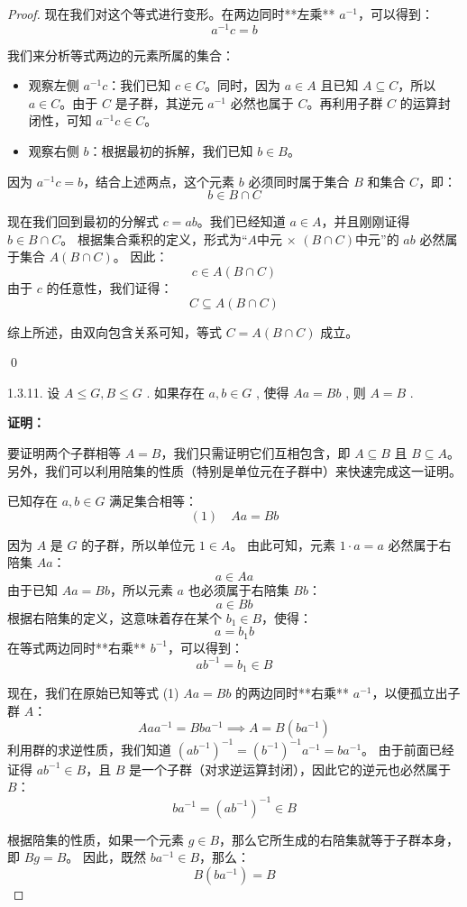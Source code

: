 \documentclass[]{article}
\begin{document}
\begin{proof}
现在我们对这个等式进行变形。在两边同时**左乘** $a^{-1}$，可以得到：
\[ a^{-1}c = b \]

我们来分析等式两边的元素所属的集合：
\begin{itemize}
	\item 观察左侧 $a^{-1}c$：我们已知 $c \in C$。同时，因为 $a \in A$ 且已知 $A \subseteq C$，所以 $a \in C$。由于 $C$ 是子群，其逆元 $a^{-1}$ 必然也属于 $C$。再利用子群 $C$ 的运算封闭性，可知 $a^{-1}c \in C$。
	\item 观察右侧 $b$：根据最初的拆解，我们已知 $b \in B$。
\end{itemize}

因为 $a^{-1}c = b$，结合上述两点，这个元素 $b$ 必须同时属于集合 $B$ 和集合 $C$，即：
\[ b \in B \cap C \]

现在我们回到最初的分解式 $c = ab$。我们已经知道 $a \in A$，并且刚刚证得 $b \in B \cap C$。
根据集合乘积的定义，形式为“$A$中元 $\times$ $(B \cap C)$中元”的 $ab$ 必然属于集合 $A(B \cap C)$。
因此：
\[ c \in A(B \cap C) \]
由于 $c$ 的任意性，我们证得：
\[ C \subseteq A(B \cap C) \]

\bigskip
综上所述，由双向包含关系可知，等式 $C = A(B \cap C)$ 成立。

\qed

1.3.11. 设 $A \leqslant G, B \leqslant G$ . 如果存在 $a, b \in G$ , 使得 $Aa = Bb$ , 则 $A = B$ . 

\bigskip
\noindent \textbf{证明：} 

要证明两个子群相等 $A = B$，我们只需证明它们互相包含，即 $A \subseteq B$ 且 $B \subseteq A$。另外，我们可以利用陪集的性质（特别是单位元在子群中）来快速完成这一证明。

已知存在 $a, b \in G$ 满足集合相等：
\[ (1) \quad Aa = Bb \]

因为 $A$ 是 $G$ 的子群，所以单位元 $1 \in A$。
由此可知，元素 $1 \cdot a = a$ 必然属于右陪集 $Aa$：
\[ a \in Aa \]
由于已知 $Aa = Bb$，所以元素 $a$ 也必须属于右陪集 $Bb$：
\[ a \in Bb \]
根据右陪集的定义，这意味着存在某个 $b_1 \in B$，使得：
\[ a = b_1 b \]
在等式两边同时**右乘** $b^{-1}$，可以得到：
\[ ab^{-1} = b_1 \in B \]

现在，我们在原始已知等式 (1) $Aa = Bb$ 的两边同时**右乘** $a^{-1}$，以便孤立出子群 $A$：
\[ Aaa^{-1} = Bba^{-1} \implies A = B(ba^{-1}) \]
利用群的求逆性质，我们知道 $(ab^{-1})^{-1} = (b^{-1})^{-1}a^{-1} = ba^{-1}$。
由于前面已经证得 $ab^{-1} \in B$，且 $B$ 是一个子群（对求逆运算封闭），因此它的逆元也必然属于 $B$：
\[ ba^{-1} = (ab^{-1})^{-1} \in B \]

根据陪集的性质，如果一个元素 $g \in B$，那么它所生成的右陪集就等于子群本身，即 $Bg = B$。
因此，既然 $ba^{-1} \in B$，那么：
\[ B(ba^{-1}) = B \]


\end{proof}
\end{document}
